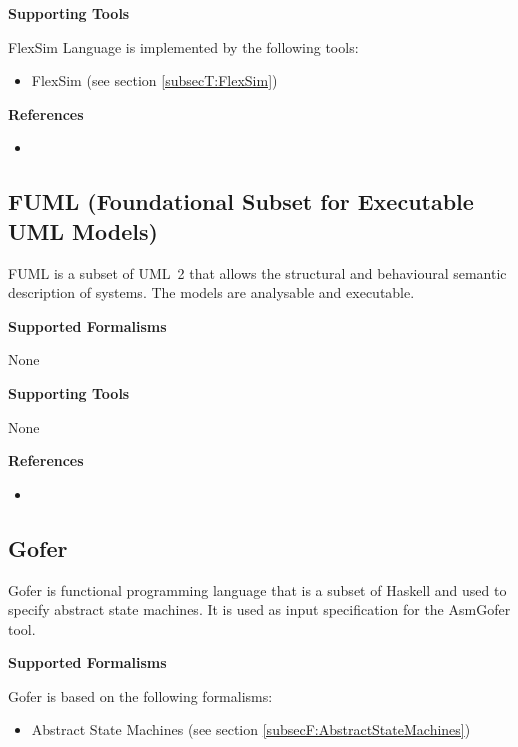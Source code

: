 \textbf{Supporting Tools}

FlexSim Language is implemented by the following tools:
\begin{itemize}
	\item FlexSim (see section \ref{subsecT:FlexSim})
\end{itemize}


\textbf{References}
\begin{itemize}
	
\item {}
\end{itemize}



\subsection{FUML (Foundational Subset for Executable UML Models)}
\label{subsecL:FUML}


FUML is a subset of UML~2 that allows the structural and behavioural semantic description of systems. The models are analysable and executable.

\textbf{Supported Formalisms}

None


\textbf{Supporting Tools}

None


\textbf{References}
\begin{itemize}
	
\item {}
\end{itemize}



\subsection{Gofer}
\label{subsecL:Gofer}


Gofer is functional programming language that is a subset of Haskell and used to specify abstract state machines. It is used as input specification for the AsmGofer tool.

\textbf{Supported Formalisms}

Gofer is based on the following formalisms:
\begin{itemize}
	\item Abstract State Machines (see section \ref{subsecF:AbstractStateMachines})
\end{itemize}


